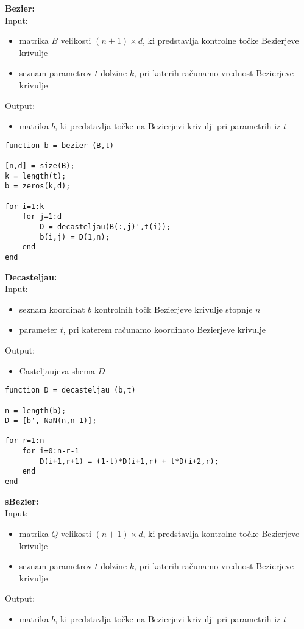 \documentclass[12pt,a4paper,twoside]{article}
\theoremstyle{definition} %
\theoremstyle{plain} %
\numberwithin{equation}{section}  %
\begin{document}
\textbf{Bezier:}\\
Input:
\begin{itemize}
\item matrika $B$ velikosti $(n+1) \times d$, ki predstavlja kontrolne točke Bezierjeve krivulje
\item seznam parametrov $t$ dolzine $k$, pri katerih računamo vrednost Bezierjeve krivulje
\end{itemize}
Output:
\begin{itemize}
\item matrika $b$, ki predstavlja točke na Bezierjevi krivulji pri parametrih iz $t$
\end{itemize}

\begin{lstlisting}[caption = {bezier}]
function b = bezier (B,t)

[n,d] = size(B);
k = length(t);
b = zeros(k,d);

for i=1:k
    for j=1:d
        D = decasteljau(B(:,j)',t(i));
        b(i,j) = D(1,n);
    end
end
\end{lstlisting}

\vspace{1cm}
\textbf{Decasteljau:}\\
Input:
\begin{itemize}
\item seznam koordinat $b$ kontrolnih točk Bezierjeve krivulje stopnje $n$
\item parameter $t$, pri katerem računamo koordinato Bezierjeve krivulje
\end{itemize}
Output:
\begin{itemize}
\item Casteljaujeva shema $D$
\end{itemize}

\begin{lstlisting}[caption = {decasteljau}]
function D = decasteljau (b,t) 

n = length(b);
D = [b', NaN(n,n-1)];

for r=1:n
    for i=0:n-r-1
        D(i+1,r+1) = (1-t)*D(i+1,r) + t*D(i+2,r);
    end
end
\end{lstlisting}

\newpage

\textbf{sBezier:}\\
Input:
\begin{itemize}
\item matrika $Q$ velikosti $(n+1) \times d$, ki predstavlja kontrolne točke Bezierjeve krivulje
\item seznam parametrov $t$ dolzine $k$, pri katerih računamo vrednost Bezierjeve krivulje
\end{itemize}
Output:
\begin{itemize}
\item matrika $b$, ki predstavlja točke na Bezierjevi krivulji pri parametrih iz $t$
\end{itemize}
\end{document}
